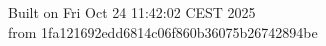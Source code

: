 {\noindent Built on Fri Oct 24 11:42:02 CEST 2025} \\ 
 {\noindent from 1fa121692edd6814c06f860b36075b26742894be}
